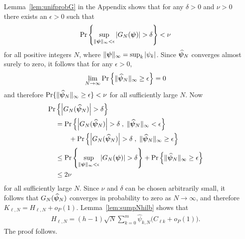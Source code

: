 \documentclass[journal]{IEEEtran}
\begin{document}
\begin{IEEEproof}
Lemma~\ref{lem:unifprobG} in the Appendix shows that for any $\delta >0$ and $\nu > 0$ there exists an $\epsilon > 0$ such that
\[
\operatorname{Pr}\left\{ \sup_{\|\boldsymbol{\psi}\|_{\infty} < \epsilon} \left\vert  G_N(\boldsymbol{\psi})  \right\vert > \delta   \right\} < \nu
\]
for all positive integers $N$, where $\|\boldsymbol{\psi}\|_\infty = \sup_{k} \left\vert \psi_k \right\vert$.  Since $\widehat{\boldsymbol{\psi}}_N$ converges almost surely to zero, it follows that for any $\epsilon > 0$,
\[
\lim_{N\rightarrow\infty}\operatorname{Pr}\left\{ \|\widehat{\boldsymbol{\psi}}_N\|_{\infty} \geq \epsilon \right\} = 0
\] 
and therefore $\operatorname{Pr}\{ \|\widehat{\boldsymbol{\psi}}_N\|_{\infty} \geq \epsilon \} < \nu$ for all sufficiently large $N$.  Now
\begin{align*}
  \operatorname{Pr}&\left\{\left\vert  G_N(\widehat{\boldsymbol{\psi}}_N)  \right\vert > \delta \right\} \\
&= \operatorname{Pr}\left\{ \left\vert G_N(\widehat{\boldsymbol{\psi}}_N) \right\vert > \delta \;, \; \|\widehat{\boldsymbol{\psi}}_N\|_{\infty} < \epsilon \right\} \\
&\hspace{0.7cm} + \operatorname{Pr}\left\{ \left\vert G_N(\widehat{\boldsymbol{\psi}}_N) \right\vert > \delta  \;, \; \|\widehat{\boldsymbol{\psi}}_N\|_{\infty} \geq \epsilon \right\} \\
&\leq \operatorname{Pr}\left\{  \sup_{\|\boldsymbol{\psi}\|_{\infty} < \epsilon} \left\vert  G_N(\boldsymbol{\psi})  \right\vert > \delta \right\} + \operatorname{Pr}\left\{ \|\widehat{\boldsymbol{\psi}}_N\|_{\infty} \geq \epsilon \right\} \\
&\leq 2\nu
\end{align*}
for all sufficiently large $N$.  Since $\nu$ and $\delta$ can be chosen arbitrarily small, it follows that $G_N(\widehat{\boldsymbol{\psi}}_N)$ converges in probability to zero as $N\rightarrow\infty$, and therefore $K_{\ell,N} = H_{\ell,N} + o_P(1)$.  Lemma~\ref{lem:sumpNhilb} shows that
\begin{align*}
H_{\ell,N} =  (h-1)\sqrt{N} \sum_{k=0}^{m}  \widehat{\psi}_{k,N} \big(C_{\ell k} + o_P(1)\big).
\end{align*}
The proof follows.
\end{IEEEproof}
\end{document}
